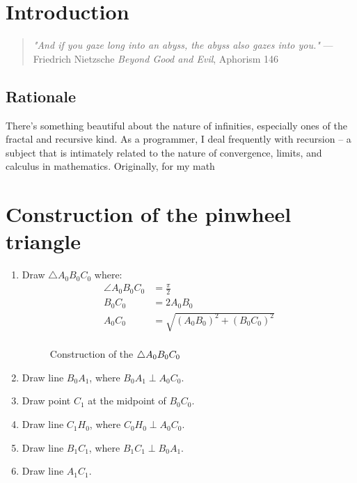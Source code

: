 \section{Introduction}
\begin{quotation}
    \emph{"And if you gaze long into an abyss, the abyss also gazes into you."}
    --- Friedrich Nietzsche \emph{Beyond Good and Evil}, Aphorism 146
\end{quotation}

\noindent


\subsection{Rationale}
There's something beautiful about the nature of infinities, especially ones of the fractal and recursive kind. As a programmer, I deal frequently with recursion -- a subject that is intimately related to the nature of convergence, limits, and calculus in mathematics. Originally, for my math


\newpage
\section{Construction of the pinwheel triangle}
\begin{enumerate}
    \item Draw $\triangle A_{0}B_{0}C_{0}$ where:
    \begin{equation}
        \begin{aligned}
            \angle A_{0}B_{0}C_{0} &= \frac{\pi}{2} \\
            B_{0}C_{0} &= 2A_{0}B_{0} \\
            A_{0}C_{0} &= \sqrt{(A_{0}B_{0})^2 + (B_{0}C_{0})^2} \\
        \end{aligned}
    \end{equation}
    \begin{figure}[H]
        \centering
        \label{right-triangle}
        \caption{Construction of the $\protect\triangle A_{0}B_{0}C_{0}$}
    \end{figure}

    \item Draw line $B_{0}A_{1}$, where $B_{0}A_{1} \perp A_{0}C_{0}$.
    \item Draw point $C_{1}$ at the midpoint of $B_{0}C_{0}$.
    \item Draw line $C_{1}H_{0}$, where $C_{0}H_{0} \perp A_{0}C_{0}$.
    \item Draw line $B_{1}C_{1}$, where $B_{1}C_{1} \perp B_{0}A_{1}$.
    \item Draw line $A_{1}C_{1}$.
\end{enumerate}

